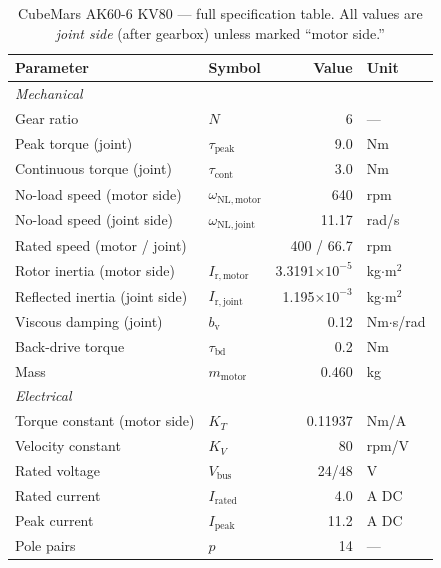 \documentclass[11pt,a4paper]{article}
\begin{document}
\begin{table}[H]
\centering
\caption{CubeMars AK60-6 KV80 --- full specification table.  All values are \emph{joint side} (after gearbox) unless marked ``motor side.''}
\label{tab:ak60_specs}
\begin{tabular}{llrl}
\toprule
\textbf{Parameter} & \textbf{Symbol} & \textbf{Value} & \textbf{Unit} \\
\midrule
\multicolumn{4}{l}{\textit{Mechanical}} \\
Gear ratio                      & $N$                  & 6       & --- \\
Peak torque (joint)             & $\tau_{\mathrm{peak}}$ & 9.0   & Nm \\
Continuous torque (joint)       & $\tau_{\mathrm{cont}}$ & 3.0   & Nm \\
No-load speed (motor side)      & $\omega_{\mathrm{NL,motor}}$ & 640 & rpm \\
No-load speed (joint side)      & $\omega_{\mathrm{NL,joint}}$ & 11.17 & rad/s \\
Rated speed (motor / joint)     &                              & 400 / 66.7 & rpm \\
Rotor inertia (motor side)      & $I_{\mathrm{r,motor}}$       & 3.3191$\times 10^{-5}$  & kg$\cdot$m$^2$ \\
Reflected inertia (joint side)  & $I_{\mathrm{r,joint}}$       & 1.195$\times 10^{-3}$  & kg$\cdot$m$^2$ \\
Viscous damping (joint)         & $b_{\mathrm{v}}$             & 0.12  & Nm$\cdot$s/rad \\
Back-drive torque               & $\tau_{\mathrm{bd}}$         & 0.2   & Nm \\
Mass                            & $m_{\mathrm{motor}}$         & 0.460 & kg \\
\midrule
\multicolumn{4}{l}{\textit{Electrical}} \\
Torque constant (motor side)    & $K_T$                & 0.11937 & Nm/A \\
Velocity constant               & $K_V$                & 80      & rpm/V \\
Rated voltage                   & $V_{\mathrm{bus}}$   & 24/48   & V \\
Rated current                   & $I_{\mathrm{rated}}$ & 4.0     & A DC \\
Peak current                    & $I_{\mathrm{peak}}$  & 11.2    & A DC \\
Pole pairs                      & $p$                  & 14      & --- \\

\end{tabular}
\end{table}
\end{document}
